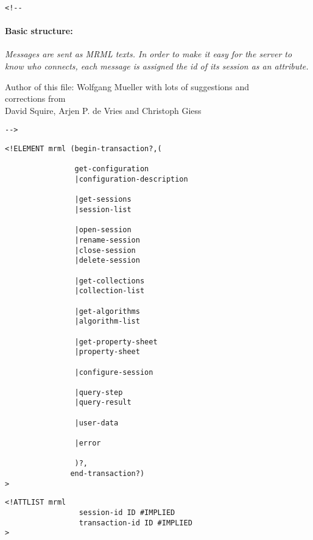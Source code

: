 \documentclass{article}
\begin{document}
\begin{verbatim}<!--\end{verbatim}
  
       \paragraph{Basic structure:}
       {\em
       Messages are sent as MRML texts.
       In  order to make it easy for the server to know who connects,
       each message is assigned the id of its session as an attribute.
       }

     \begin{center}
      Author of this file: 
      Wolfgang Mueller with lots of suggestions and \\
                                   corrections from \\
      David Squire, Arjen P. de Vries and Christoph Giess \\
     \end{center}
       
 \begin{verbatim}-->\end{verbatim}



\begin{verbatim}
<!ELEMENT mrml (begin-transaction?,(

                get-configuration
                |configuration-description

                |get-sessions
                |session-list

                |open-session
                |rename-session
                |close-session
                |delete-session

                |get-collections
                |collection-list

                |get-algorithms
                |algorithm-list

                |get-property-sheet
                |property-sheet

                |configure-session

                |query-step
                |query-result

                |user-data

                |error

                )?,
               end-transaction?) 
>\end{verbatim}

\begin{verbatim}
<!ATTLIST mrml 
                 session-id ID #IMPLIED
                 transaction-id ID #IMPLIED
>\end{verbatim}
\end{document}
